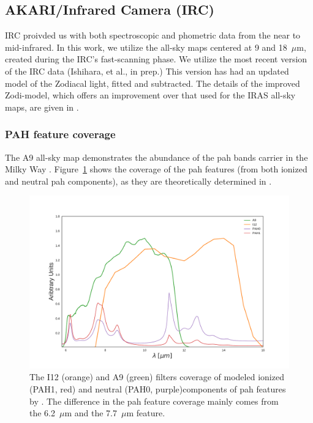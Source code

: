        \subsection{AKARI/Infrared Camera (IRC) }
           IRC proivded us with both spectroscopic and phometric data from the near to mid-infrared. In this work, we utilize the all-sky maps centered at 9 and 18~$\mu$m, created during the IRC's fast-scanning phase. We utilize the most recent version of the IRC data (Ishihara, et al., in prep.) This version has had an updated model of the Zodiacal light, fitted and subtracted. The details of the improved Zodi-model, which offers an improvement over that used for the IRAS all-sky maps, are given in \cite{kondo16}.
       \subsubsection{PAH feature coverage}
         The A9 all-sky map demonstrates the abundance of the \acrshort{pah} bands carrier in the Milky Way \citep{ishihara10}. Figure~\ref{fig:Filter_coverage_example_PAH} shows the coverage of the \acrshort{pah} features (from both ionized and neutral \acrshort{pah} components), as they are theoretically determined in \cite{dustem11}.
            \begin{figure}
              \centering
              \includegraphics[width=\textwidth]{../Plots/ch_datasources/Filter_coverage_example_PAH.pdf}
              \caption{The I12 (orange) and A9 (green) filters coverage of modeled ionized (PAH1, red) and neutral (PAH0, purple)components of \acrshort{pah} features by \cite{dustem11}. The difference in the \acrshort{pah} feature coverage mainly comes from the 6.2~$\mu$m and the 7.7~$\mu$m feature.}
              \label{fig:Filter_coverage_example_PAH}
            \end{figure}
